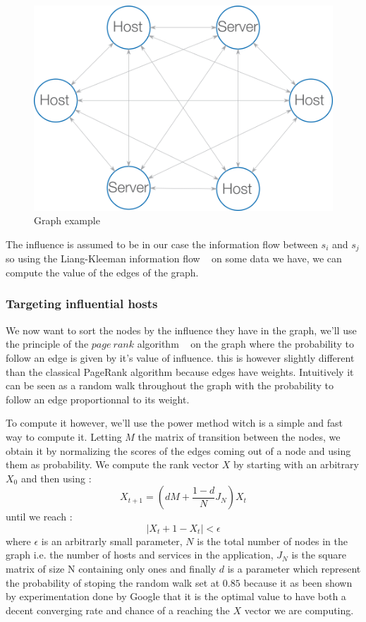\documentclass[10pt,a4paper,oneside]{article}
\begin{document}
\begin{figure}[!h]
\centering
\includegraphics[scale=0.6]{./images/PNG/Graphe.png}
\caption{Graph example}
\label{graphe}
\end{figure}

\begin{multicols}{2}
The influence is assumed to be in our case the information flow between $s_i$ and $s_j$ so using the Liang-Kleeman information flow ~\cite{ref3} on some data we have, we can compute the value of the edges of the graph.

\subsubsection{Targeting influential hosts}
We now want to sort the nodes by the influence they have in the graph, we'll use the principle of the $page~rank$ algorithm ~\cite{ref4} on the graph where the probability to follow an edge is given by it's value of influence. this is however slightly different than the classical PageRank algorithm because edges have weights. Intuitively it can be seen as a random walk throughout the graph with the probability to follow an edge proportionnal to its weight.

To compute it however, we'll  use the power method witch is a simple and fast way to compute it. Letting $M$ the matrix of transition between the nodes, we obtain it by normalizing the scores of the edges coming out of a node and using them as probability. We compute the rank vector $X$ by starting with an arbitrary $X_0$ and then using :
	\[X_{t+1} = (dM + \frac{1-d}{N}J_N)X_t\]
until we reach :
	\[ \mid{X_t+1 - X_t}\mid < \epsilon\]
where $\epsilon$ is an arbitrarly small parameter, $N$ is the total number of nodes in the graph i.e. the number of hosts and services in the application, $J_N$ is the square matrix of size N containing only ones and finally $d$ is a parameter which represent the probability of stoping the random walk set at $0.85$ because it as been shown by experimentation done by Google that it is the optimal value to have both a decent converging rate and chance of a reaching the $X$ vector we are computing.
\end{multicols}
\end{document}
